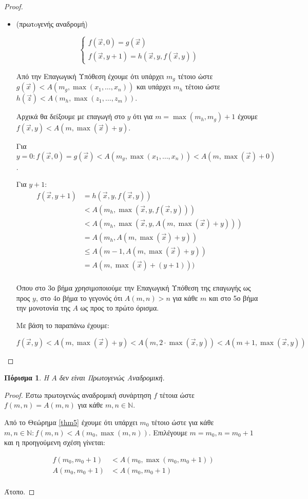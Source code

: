 \documentclass[a4paper, oneside, 11pt]{article}
\newtheorem{col}[thm]{Πόρισμα}
\theoremstyle{definition}
\newcommand{\ora}{\vec}
\begin{document}
\begin{proof}
\begin{itemize}
\item (πρωτoγενής αναδρομή)

\[ \left\{ \begin{array}{l}
f(\ora{x}, 0) = g(\ora{x})\\
f(\ora{x}, y+1) = h(\ora{x}, y, f(\ora{x}, y))
\end{array} \right.
\]

Από την Επαγωγική Υπόθεση έχουμε ότι υπάρχει $m_g$ τέτοιο ώστε $g(\ora{x}) <
A(m_g, \max(x_1, \ldots, x_n))$ και υπάρχει $m_h$ τέτοιο ώστε $h(\ora{z})
< A(m_h, \max(z_1, \ldots, z_m))$.

Αρχικά θα δείξουμε με επαγωγή στο $y$ ότι για $m = \max(m_h, m_g) + 1$
έχουμε $f(\ora{x}, y) < A(m, \max(\ora{x}) + y)$.

Για $y = 0: f(\ora{x}, 0) = g(\ora{x}) < A(m_g, \max(x_1, \ldots, x_n)) < A(m,
\max(\ora{x}) + 0)$.

Για $y+1$:
\begin{align*}
f(\ora{x}, y+1) &= h(\ora{x}, y, f(\ora{x}, y))\\
                &< A(m_h, \max(\ora{x}, y, f(\ora{x}, y)))\\
                &< A(m_h, \max(\ora{x}, y, A(m, \max(\ora{x}) + y)))\\
                &= A(m_h, A(m, \max(\ora{x})+y))\\
                &\leq A(m-1, A(m, \max(\ora{x})+y))\\
                &= A(m, \max(\ora{x}) + (y + 1)))\\
\end{align*}

Όπου στο 3ο βήμα χρησιμοποιούμε την Επαγωγική Υπόθεση της επαγωγής ως προς $y$,
στο 4ο βήμα το γεγονός ότι $A(m, n) > n$ για κάθε $m$ και στο 5ο βήμα την
μονοτονία της $A$ ως προς το πρώτο όρισμα.

Με βάση το παραπάνω έχουμε:

\[ f(\ora{x}, y) < A(m, \max(\ora{x}) + y) < A(m, 2\cdot \max(\ora{x}, y)) <
A(m+1, \max(\ora{x}, y)) \]

\end{itemize}
\end{proof}

\begin{col}
Η $A$ δεν είναι Πρωτογενώς Αναδρομική.
\end{col}
\begin{proof}
Έστω πρωτογενώς αναδρομική συνάρτηση $f$ τέτοια ώστε $f(m, n) = A(m, n)$ για
κάθε $m, n \in \mathbb{N}$.

Από το Θεώρημα \ref{thm5} έχουμε ότι υπάρχει $m_0$ τέτοιο ώστε για κάθε $m, n
\in \mathbb{N}: f(m, n) < A(m_0, \max(m, n))$. Επιλέγουμε $m = m_0, n = m_0 + 1$
και η προηγούμενη σχέση γίνεται:

\begin{align*}
   f(m_0, m_0+1) &< A(m_0, \max(m_0, m_0+1))\\
   A(m_0, m_0+1) &< A(m_0, m_0+1)\\
\end{align*}

Άτοπο.
\end{proof}
\end{document}
